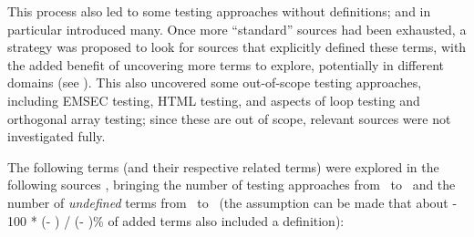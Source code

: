
This process also led to some testing approaches without definitions;
\citep{IEEE2022} and \citep{Firesmith2015} in particular introduced many.
Once more ``standard'' sources had been exhausted, a strategy was proposed to
look for sources that explicitly defined these terms, with the added benefit of
uncovering more terms to explore, potentially in different domains (see
). This also uncovered some out-of-scope testing approaches,
including EMSEC testing, HTML testing, and aspects of loop testing and
orthogonal array testing; since these
are out of scope, relevant sources were not investigated fully.

The following terms (and their respective related terms)
were explored%
\ifnotpaper
      { in the following sources}%
\fi, bringing the number of testing
approaches from \the\TotalBefore~to \the\TotalAfter~and the number of
\emph{undefined} terms from \the\UndefBefore~to \the\UndefAfter~(the assumption
can be made that about \the{} - 100 * (\UndefAfter - \UndefBefore) /
(\TotalAfter - \TotalBefore)\relax\% of added terms also included a definition):

